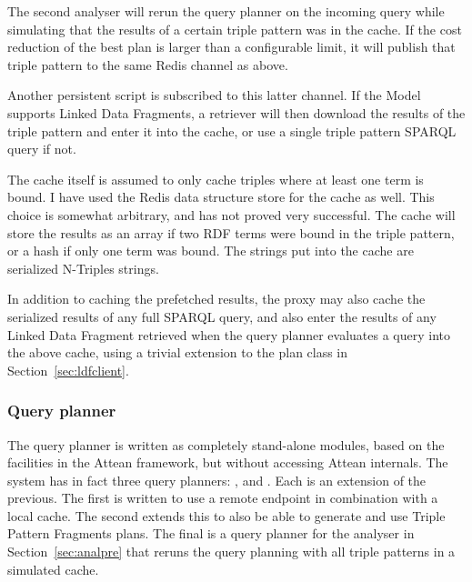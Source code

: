 \documentclass[a4paper, 12pt]{article}
\begin{document}
The second analyser will rerun the query planner on the incoming query
while simulating that the results of a certain triple pattern was in
the cache. If the cost reduction of the best plan is larger than a
configurable limit, it will publish that triple pattern to the same
Redis channel as above. 

Another persistent script is subscribed to this latter channel. If the
Model supports Linked Data Fragments, a retriever will then download
the results of the triple pattern and enter it into the cache, or use
a single triple pattern SPARQL query if not.

The cache itself is assumed to only cache triples where at least one
term is bound. I have used the Redis data structure store for the
cache as well. This choice is somewhat arbitrary, and has not proved
very successful. The cache will store the results as an array if two
RDF terms were bound in the triple pattern, or a hash if only one term
was bound. The strings put into the cache are serialized N-Triples
strings.

In addition to caching the prefetched results, the proxy may also
cache the serialized results of any full SPARQL query, and also enter
the results of any Linked Data Fragment retrieved when the query
planner evaluates a query into the above cache, using a trivial
extension to the plan class in Section~\ref{sec:ldfclient}.



\subsubsection{Query planner}\label{sec:implqueryplan}

The query planner is written as completely stand-alone modules, based
on the facilities in the Attean framework, but without accessing
Attean internals. The system has in fact three query planners:
,
 and
. Each is an
extension of the previous. The first is written to use a remote
endpoint in combination with a local cache. The second extends this to
also be able to generate and use Triple Pattern Fragments plans. The
final is a query planner for the analyser in Section~\ref{sec:analpre}
that reruns the query planning with all triple patterns in a simulated
cache.
\end{document}
